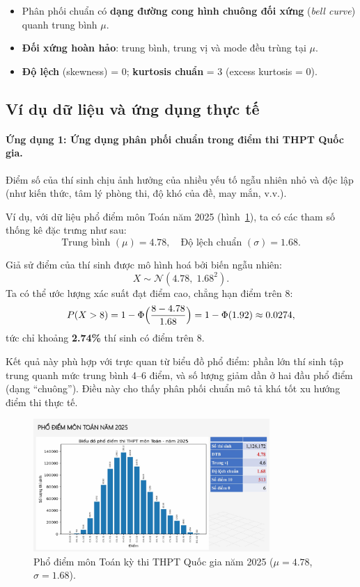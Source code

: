 \begin{itemize}
    \item Phân phối chuẩn có \textbf{dạng đường cong hình chuông đối xứng} (\textit{bell curve}) quanh trung bình $\mu$.
    \item \textbf{Đối xứng hoàn hảo}: trung bình, trung vị và mode đều trùng tại $\mu$.
    \item \textbf{Độ lệch} (skewness) = 0; \textbf{kurtosis chuẩn} = 3 (excess kurtosis = 0).
\end{itemize}

\subsection{Ví dụ dữ liệu và ứng dụng thực tế }

\paragraph{Ứng dụng 1: Ứng dụng phân phối chuẩn trong điểm thi THPT Quốc gia.}   
Điểm số của thí sinh chịu ảnh hưởng của nhiều yếu tố ngẫu nhiên nhỏ và độc lập 
(như kiến thức, tâm lý phòng thi, độ khó của đề, may mắn, v.v.).

Ví dụ, với dữ liệu phổ điểm môn Toán năm 2025 (hình~\ref{fig:thpt2025}), 
ta có các tham số thống kê đặc trưng như sau:
\[
\text{Trung bình } (\mu) = 4.78, \quad 
\text{Độ lệch chuẩn } (\sigma) = 1.68.
\]

Giả sử điểm của thí sinh được mô hình hoá bởi biến ngẫu nhiên:
\[
X \sim \mathcal{N}(4.78,\;1.68^2).
\]
Ta có thể ước lượng xác suất đạt điểm cao, chẳng hạn điểm trên 8:
\[
P(X > 8) = 1 - \Phi\Bigl(\frac{8 - 4.78}{1.68}\Bigr)
= 1 - \Phi(1.92) \approx 0.0274,
\]
tức chỉ khoảng \textbf{2.74\%} thí sinh có điểm trên 8.

Kết quả này phù hợp với trực quan từ biểu đồ phổ điểm: 
phần lớn thí sinh tập trung quanh mức trung bình 4--6 điểm, 
và số lượng giảm dần ở hai đầu phổ điểm (dạng “chuông”).  
Điều này cho thấy phân phối chuẩn mô tả khá tốt xu hướng điểm thi thực tế.

\begin{figure}[h!]
    \centering
    \includegraphics[width=0.8\textwidth]{images/PhodiemToan2025.png}
    \caption{Phổ điểm môn Toán kỳ thi THPT Quốc gia năm 2025 ($\mu = 4.78$, $\sigma = 1.68$).}
    \label{fig:thpt2025}
\end{figure}

